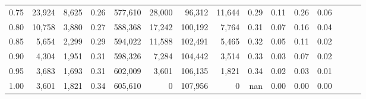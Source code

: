 \begin{tabular}{rrrrrrrrrrrrrrr}
0.75 &  23,924 &   8,625 &  0.26 &  577,610 &   28,000 &   96,312 &   11,644 &  0.29 &  0.11 &  0.26 &      0.06 \\
0.80 &  10,758 &   3,880 &  0.27 &  588,368 &   17,242 &  100,192 &    7,764 &  0.31 &  0.07 &  0.16 &      0.04 \\
0.85 &   5,654 &   2,299 &  0.29 &  594,022 &   11,588 &  102,491 &    5,465 &  0.32 &  0.05 &  0.11 &      0.02 \\
0.90 &   4,304 &   1,951 &  0.31 &  598,326 &    7,284 &  104,442 &    3,514 &  0.33 &  0.03 &  0.07 &      0.02 \\
0.95 &   3,683 &   1,693 &  0.31 &  602,009 &    3,601 &  106,135 &    1,821 &  0.34 &  0.02 &  0.03 &      0.01 \\
1.00 &   3,601 &   1,821 &  0.34 &  605,610 &        0 &  107,956 &        0 &   nan &  0.00 &  0.00 &      0.00 \\
\bottomrule
\end{tabular}
